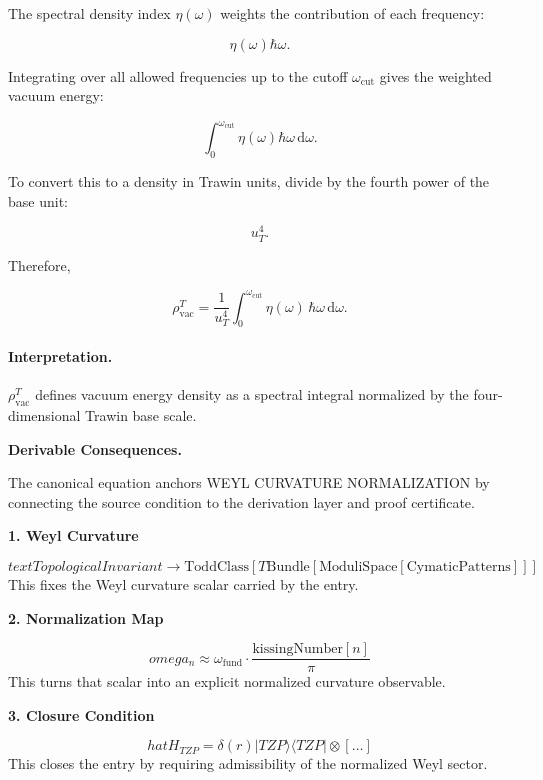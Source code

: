 The spectral density index $\eta(\omega)$ weights the contribution of each frequency:

\begin{equation}
\eta(\omega)\hbar\omega .
\end{equation}

Integrating over all allowed frequencies up to the cutoff $\omega_{\mathrm{cut}}$ gives the weighted vacuum energy:

\begin{equation}
\int_{0}^{\omega_{\mathrm{cut}}}
\eta(\omega)\hbar\omega\,\mathrm{d}\omega .
\end{equation}

To convert this to a density in Trawin units, divide by the fourth power of the base unit:

\begin{equation}
u_T^4 .
\end{equation}

Therefore,

\begin{equation}
\boxed{
\rho_{\mathrm{vac}}^{T}
=
\frac{1}{u_T^4}
\int_{0}^{\omega_{\mathrm{cut}}}
\eta(\omega)\,
\hbar\omega\,
\mathrm{d}\omega .
}
\end{equation}

\paragraph{Interpretation.}
$\rho_{\mathrm{vac}}^{T}$ defines vacuum energy density as a spectral integral normalized by the four-dimensional Trawin base scale.

\par\vspace{0.35em}
\noindent\textbf{Derivable Consequences.}\quad
\begingroup
\footnotesize
\raggedright
The canonical equation anchors WEYL CURVATURE NORMALIZATION by connecting the source condition to the derivation layer and proof certificate.
\par\endgroup

\noindent\textbf{1. Weyl Curvature}\par
\[
text{TopologicalInvariant} \to \text{ToddClass}[T\text{Bundle}[\text{ModuliSpace}[\text{CymaticPatterns}]]]
\]
\noindent This fixes the Weyl curvature scalar carried by the entry.\par
\noindent\textbf{2. Normalization Map}\par
\[
omega_n \approx \omega_{\text{fund}} \cdot \frac{\text{kissingNumber}[n]}{\pi}
\]
\noindent This turns that scalar into an explicit normalized curvature observable.\par
\noindent\textbf{3. Closure Condition}\par
\[
hat{H}_{TZP} = \delta(r)|TZP\rangle\langle TZP| \otimes [ \dots ]
\]
\noindent This closes the entry by requiring admissibility of the normalized Weyl sector.\par

